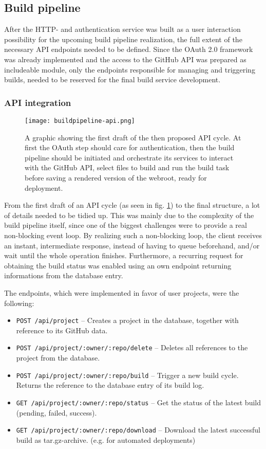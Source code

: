 \subsection{Build pipeline}
After the HTTP- and authentication service was built as a user interaction possibility for the upcoming build pipeline realization, the full extent of the necessary API endpoints needed to be defined. Since the OAuth 2.0 framework was already implemented and the access to the GitHub API was prepared as includeable module, only the endpoints responsible for managing and triggering builds, needed to be reserved for the final build service development.

\subsubsection{API integration}

\begin{figure} %
    \centering
    \texttt{[image: buildpipeline-api.png]}
    \caption{A graphic showing the first draft of the then proposed API cycle. At first the OAuth step should care for authentication, then the build pipeline should be initiated and orchestrate its services to interact with the GitHub API, select files to build and run the build task before saving a rendered version of the webroot, ready for deployment.}
    \label{fig:buildpipeline-api}
\end{figure}
%

From the first draft of an API cycle (as seen in fig. \ref{fig:buildpipeline-api}) to the final structure, a lot of details needed to be tidied up. This was mainly due to the complexity of the build pipeline itself, since one of the biggest challenges were to provide a real non-blocking event loop. By realizing such a non-blocking loop, the client receives an instant, intermediate response, instead of having to queue beforehand, and/or wait until the whole operation finishes. Furthermore, a recurring request for obtaining the build status was enabled using an own endpoint returning informations from the database entry.

The endpoints, which were implemented in favor of user projects, were the following:

\begin{itemize}
  \item \texttt{POST /api/project} -- Creates a project in the database, together with reference to its GitHub data.
  \item \texttt{POST /api/project/:owner/:repo/delete} -- Deletes all references to the project from the database.
  \item \texttt{POST /api/project/:owner/:repo/build} -- Trigger a new build cycle. Returns the reference to the database entry of its build log.
  \item \texttt{GET /api/project/:owner/:repo/status} -- Get the status of the latest build (pending, failed, success).
  \item \texttt{GET /api/project/:owner/:repo/download} -- Download the latest successful build as tar.gz-archive. (e.g. for automated deployments)
\end{itemize}
